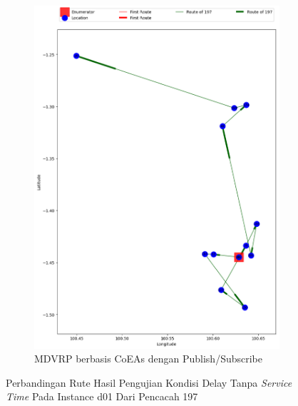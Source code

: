 \begin{figure}[H]\ContinuedFloat
	\centering
	\begin{subfigure}[t]{\textwidth}
		\centering
		\includegraphics[width=\textwidth]{Resources/Images/delayed_1/real_m15_n100_delayed_1_197_pubsub_coes}
		\caption{MDVRP berbasis CoEAs dengan Publish/Subscribe}
		\label{fig:real_m15_n100_delayed_1_197_pubsub_coes}
	\end{subfigure}
	\caption{Perbandingan Rute Hasil Pengujian Kondisi Delay Tanpa \textit{Service Time} Pada Instance d01 Dari Pencacah 197}
	\label{fig:real_m15_n100_delayed_1_197_contd}
\end{figure}


